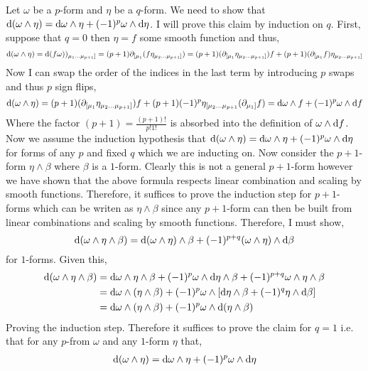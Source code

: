 \documentclass[12pt]{article}
\begin{document}
Let $\omega$ be a $p$-form and $\eta$ be a $q$-form. 
We need to show that $\mathrm{d} (\omega \wedge \eta) = \mathrm{d} \omega \wedge \eta + (-1)^{p} \omega \wedge \mathrm{d} \eta$. I will prove this claim by induction on $q$. First, suppose that $q = 0$ then $\eta = f$ some smooth function and thus,
\[ \mathrm{d} (\omega \wedge \eta) = \mathrm{d} (f \omega))_{\mu_1 \dots \mu_{p+1}]} = (p + 1) \partial_{[ \mu_1} (f \eta_{\mu_2 \dots \mu_{p+1}]}) = (p + 1) (\partial_{[ \mu_1} \eta_{\mu_2 \dots \mu_{p+1}]}) f + (p + 1) (\partial_{[ \mu_1} f) \eta_{\mu_2 \dots \mu_{p+1}]} \]
Now I can swap the order of the indices in the last term by introducing $p$ swaps and thus $p$ sign flips,
\[ \mathrm{d} (\omega \wedge \eta) =  (p + 1) (\partial_{[ \mu_1} \eta_{\mu_2 \dots \mu_{p+1}]}) f + (p + 1) (-1)^{p}  \eta_{[\mu_2 \dots \mu_{p+1}} (\partial_{ \mu_1]} f) = \mathrm{d} \omega \wedge f + (-1)^p \omega \wedge \mathrm{d} f \]
Where the factor $(p + 1) = \frac{(p + 1)!}{p! 1!}$ is absorbed into the definition of $\omega \wedge \mathrm{d} f$. Now we assume the induction hypothesis that $\mathrm{d} (\omega \wedge \eta) = \mathrm{d} \omega \wedge \eta + (-1)^{p} \omega \wedge \mathrm{d} \eta$ for forms of any $p$ and fixed $q$ which we are inducting on. Now consider the $p+1$-form $\eta \wedge \beta$ where $\beta$ is a $1$-form. Clearly this is not a general $p+1$-form however we have shown that the above formula respects linear combination and scaling by smooth functions. Therefore, it suffices to prove the induction step for $p+1$-forms which can be writen as $\eta \wedge \beta$ since any $p+1$-form can then be built from linear combinations and scaling by smooth functions. Therefore, I must show,
\[ \mathrm{d} (\omega \wedge \eta \wedge \beta) = \mathrm{d} (\omega \wedge \eta) \wedge \beta + (-1)^{p + q} (\omega \wedge \eta) \wedge \mathrm{d} \beta \]
for $1$-forms. Given this,
\begin{align*}
\mathrm{d} (\omega \wedge \eta \wedge \beta) & = \mathrm{d} \omega \wedge \eta \wedge \beta + (-1)^p \omega \wedge \mathrm{d} \eta \wedge \beta + (-1)^{p + q} \omega \wedge \eta \wedge \beta 
\\
& = \mathrm{d} \omega \wedge (\eta \wedge \beta) + (-1)^p \omega \wedge [\mathrm{d} \eta \wedge \beta + (-1)^q \eta \wedge \mathrm{d} \beta]
\\
& = \mathrm{d} \omega \wedge (\eta \wedge \beta) + (-1)^p \omega \wedge \mathrm{d} (\eta \wedge \beta)
\end{align*}
Proving the induction step. Therefore it suffices to prove the claim for $q = 1$ i.e. that for any $p$-from $\omega$ and any $1$-form $\eta$ that,
\begin{align*}
\mathrm{d} (\omega \wedge \eta) = \mathrm{d} \omega \wedge \eta + (-1)^p \omega \wedge \mathrm{d} \eta 
\end{align*}
\end{document}
